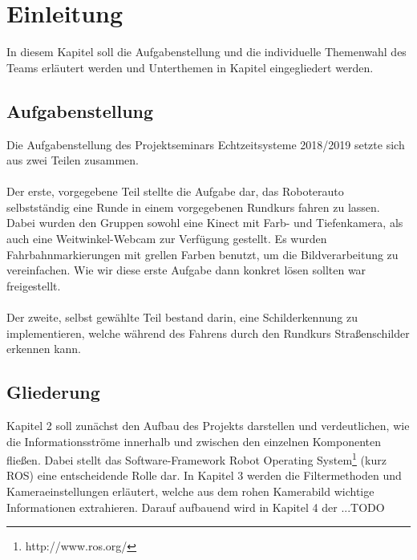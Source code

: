 \section{Einleitung}
In diesem Kapitel soll die Aufgabenstellung und die individuelle Themenwahl des Teams erl\"autert werden und Unterthemen in Kapitel eingegliedert werden.


\subsection{Aufgabenstellung}
Die Aufgabenstellung des Projektseminars Echtzeitsysteme 2018/2019 setzte sich aus zwei Teilen zusammen. \\\\
Der erste, vorgegebene Teil stellte die Aufgabe dar, das Roboterauto selbstst\"andig eine Runde in einem vorgegebenen Rundkurs fahren zu lassen. Dabei wurden den Gruppen sowohl eine Kinect mit Farb- und Tiefenkamera, als auch eine Weitwinkel-Webcam zur Verf\"ugung gestellt. Es wurden Fahrbahnmarkierungen mit grellen Farben benutzt, um die Bildverarbeitung zu vereinfachen. Wie wir diese erste Aufgabe dann konkret l\"osen sollten war freigestellt. \\\\
Der zweite, selbst gew\"ahlte Teil bestand darin, eine Schilderkennung zu implementieren, welche w\"ahrend des Fahrens durch den Rundkurs Stra\ss{}enschilder erkennen kann.

\subsection{Gliederung}
Kapitel 2 soll zun\"achst den Aufbau des Projekts darstellen und verdeutlichen, wie die Informationsstr\"ome innerhalb und zwischen den einzelnen Komponenten flie\ss{}en. Dabei stellt das Software-Framework Robot Operating System\footnote{http://www.ros.org/} (kurz ROS) eine entscheidende Rolle dar. In Kapitel 3 werden die Filtermethoden und Kameraeinstellungen erl\"autert, welche aus dem rohen Kamerabild wichtige Informationen extrahieren. Darauf aufbauend wird in Kapitel 4 der ...TODO